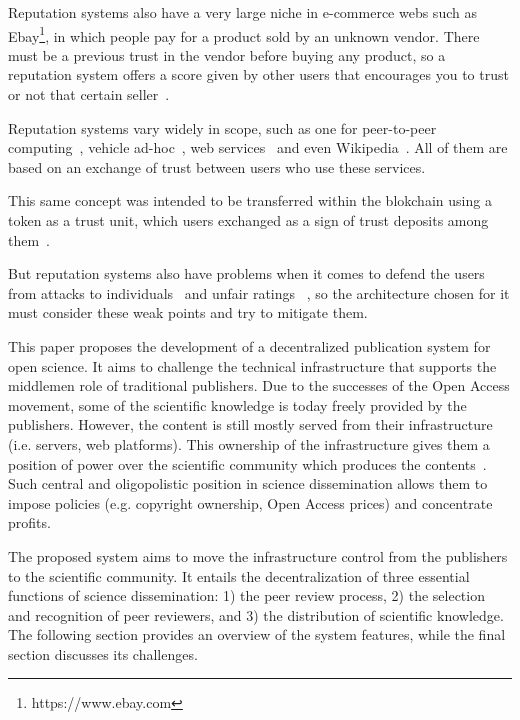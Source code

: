Reputation systems also have a very large niche in e-commerce webs such as
Ebay\footnote{https://www.ebay.com}, in which people pay for a product sold by
an unknown vendor. There must be a previous trust in the vendor before buying
any product, so a reputation system offers a score given by other users that
encourages you to trust or not that certain seller~\cite{resnick2002trust}.

Reputation systems vary widely in scope, such as one for peer-to-peer
computing~\cite{zhou2007powertrust}, vehicle ad-hoc~\cite{dotzer2005vars}, web
services~\cite{moore2008reputation} and even Wikipedia~\cite{adler2007content}.
All of them are based on an exchange of trust between users who use these
services.

This same concept was intended to be transferred within the blokchain using a
token as a trust unit, which users exchanged as a sign of trust deposits among
them~\cite{sharples2016blockchain}.

But reputation systems also have problems when it comes to defend the users from
attacks to individuals~\cite{hoffman2009survey} and unfair ratings
~\cite{whitby2004filtering}, so the architecture chosen for it must consider
these weak points and try to mitigate them.

This paper proposes the development of a decentralized publication system for
open science. It aims to challenge the technical infrastructure that supports
the middlemen role of traditional publishers. Due to the successes of the Open
Access movement, some of the scientific knowledge is today freely provided by
the publishers. However, the content is still mostly served from their
infrastructure (i.e. servers, web platforms). This ownership of the
infrastructure gives them a position of power over the scientific community
which produces the contents~\cite{fuster2010governance}. Such central and
oligopolistic position in science dissemination allows them to impose policies
(e.g. copyright ownership, Open Access prices) and concentrate profits.

The proposed system aims to move the infrastructure control from the publishers
to the scientific community. It entails the decentralization of three essential
functions of science dissemination: 1) the peer review process, 2) the selection
and recognition of peer reviewers, and 3) the distribution of scientific
knowledge. The following section provides an overview of the system features,
while the final section discusses its challenges.


